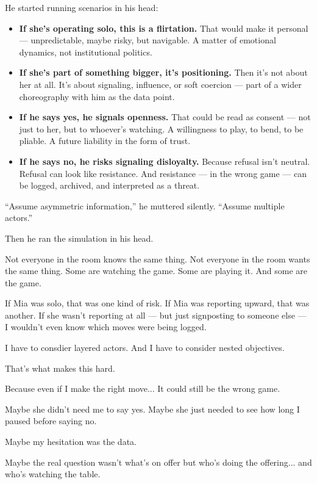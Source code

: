 \medskip

He started running scenarios in his head:

\begin{itemize}
    \item \textbf{If she’s operating solo, this is a flirtation.}
    That would make it personal — unpredictable, maybe risky, but navigable. A matter of emotional dynamics, not institutional politics.

    \item \textbf{If she’s part of something bigger, it’s positioning.} 
    Then it’s not about her at all. It’s about signaling, influence, or soft coercion — part of a wider choreography with him as the data point.

    \item \textbf{If he says yes, he signals openness.} 
    That could be read as consent — not just to her, but to whoever’s watching. A willingness to play, to bend, to be pliable. A future liability in the form of trust.

    \item \textbf{If he says no, he risks signaling disloyalty.} 
    Because refusal isn’t neutral. Refusal can look like resistance. And resistance — in the wrong game — can be logged, archived, and interpreted as a threat.
\end{itemize}


``Assume asymmetric information,'' he muttered silently. ``Assume multiple actors.''

Then he ran the simulation in his head.

\begin{tcolorbox}[
    enhanced,
    sharp corners,
    boxrule=0pt,
    colback=gray!3,
    borderline west={2pt}{0pt}{gray!60}, %
    left=10pt,
    right=10pt,
    top=6pt,
    bottom=6pt,
    width=\linewidth,
    fontupper=\small\itshape
  ]
Not everyone in the room knows the same thing.
Not everyone in the room wants the same thing.
Some are watching the game.
Some are playing it.
And some are the game.

If Mia was solo, that was one kind of risk.
If Mia was reporting upward, that was another.
If she wasn’t reporting at all --- but just signposting to someone else --- I wouldn’t 
even know which moves were being logged.

I have to consdier layered actors. 
And I have to consider nested objectives.

That’s what makes this hard.

Because even if I make the right move...
It could still be the wrong game.

Maybe she didn’t need me to say yes.
Maybe she just needed to see how long I paused before saying no.

Maybe my hesitation was the data.

Maybe the real question wasn’t what’s on offer
but who’s doing the offering... and who’s watching the table.
\end{tcolorbox}

